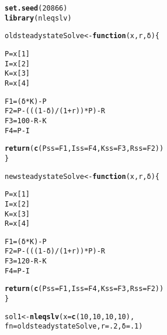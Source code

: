 \documentclass{article}\usepackage[]{graphicx}\usepackage[]{color}
\makeatletter
\newcommand{\hlnum}[1]{\textcolor[rgb]{0.686,0.059,0.569}{#1}}%
\newcommand{\hlopt}[1]{\textcolor[rgb]{0,0,0}{#1}}%
\newcommand{\hlstd}[1]{\textcolor[rgb]{0.345,0.345,0.345}{#1}}%
\newcommand{\hlkwa}[1]{\textcolor[rgb]{0.161,0.373,0.58}{\textbf{#1}}}%
\newcommand{\hlkwb}[1]{\textcolor[rgb]{0.69,0.353,0.396}{#1}}%
\newcommand{\hlkwc}[1]{\textcolor[rgb]{0.333,0.667,0.333}{#1}}%
\newcommand{\hlkwd}[1]{\textcolor[rgb]{0.737,0.353,0.396}{\textbf{#1}}}%
\newenvironment{kframe}{%
 \def\at@end@of@kframe{}%
 \ifinner\ifhmode%
  \def\at@end@of@kframe{\end{minipage}}%
  \begin{minipage}{\columnwidth}%
 \fi\fi%
 \def\FrameCommand##1{\hskip\@totalleftmargin \hskip-\fboxsep
 \colorbox{shadecolor}{##1}\hskip-\fboxsep
     \hskip-\linewidth \hskip-\@totalleftmargin \hskip\columnwidth}%
 \MakeFramed {\advance\hsize-\width
   \@totalleftmargin\z@ \linewidth\hsize
   \@setminipage}}%
 {\par\unskip\endMakeFramed%
 \at@end@of@kframe}
\newenvironment{knitrout}{}{} %
\makeatother
\begin{document}
\begin{knitrout}
\color{fgcolor}\begin{kframe}
\begin{alltt}
\hlkwd{set.seed}\hlstd{(}\hlnum{20866}\hlstd{)}
\hlkwd{library}\hlstd{(nleqslv)}

\hlstd{oldsteadystateSolve} \hlkwb{<-} \hlkwa{function}\hlstd{(}\hlkwc{x}\hlstd{,}\hlkwc{r}\hlstd{,}\hlkwc{δ}\hlstd{)\{}

  \hlstd{P} \hlkwb{=} \hlstd{x[}\hlnum{1}\hlstd{]}
  \hlstd{I} \hlkwb{=} \hlstd{x[}\hlnum{2}\hlstd{]}
  \hlstd{K} \hlkwb{=} \hlstd{x[}\hlnum{3}\hlstd{]}
  \hlstd{R} \hlkwb{=} \hlstd{x[}\hlnum{4}\hlstd{]}

  \hlstd{F1} \hlkwb{=} \hlstd{(δ} \hlopt{*} \hlstd{K)} \hlopt{-} \hlstd{P}
  \hlstd{F2} \hlkwb{=} \hlstd{P} \hlopt{-} \hlstd{(((}\hlnum{1} \hlopt{-}\hlstd{δ)}\hlopt{/}\hlstd{(}\hlnum{1} \hlopt{+} \hlstd{r))} \hlopt{*} \hlstd{P)} \hlopt{-} \hlstd{R}
  \hlstd{F3} \hlkwb{=} \hlnum{100} \hlopt{-} \hlstd{R} \hlopt{-} \hlstd{K}
  \hlstd{F4} \hlkwb{=} \hlstd{P} \hlopt{-} \hlstd{I}

  \hlkwd{return}\hlstd{(}\hlkwd{c}\hlstd{(}\hlkwc{Pss}\hlstd{=F1,} \hlkwc{Iss}\hlstd{=F4,} \hlkwc{Kss}\hlstd{=F3,} \hlkwc{Rss}\hlstd{=F2))}
\hlstd{\}}

\hlstd{newsteadystateSolve} \hlkwb{<-} \hlkwa{function}\hlstd{(}\hlkwc{x}\hlstd{,}\hlkwc{r}\hlstd{,}\hlkwc{δ}\hlstd{)\{}

  \hlstd{P} \hlkwb{=} \hlstd{x[}\hlnum{1}\hlstd{]}
  \hlstd{I} \hlkwb{=} \hlstd{x[}\hlnum{2}\hlstd{]}
  \hlstd{K} \hlkwb{=} \hlstd{x[}\hlnum{3}\hlstd{]}
  \hlstd{R} \hlkwb{=} \hlstd{x[}\hlnum{4}\hlstd{]}

  \hlstd{F1} \hlkwb{=} \hlstd{(δ} \hlopt{*} \hlstd{K)} \hlopt{-} \hlstd{P}
  \hlstd{F2} \hlkwb{=} \hlstd{P} \hlopt{-} \hlstd{(((}\hlnum{1} \hlopt{-}\hlstd{δ)}\hlopt{/}\hlstd{(}\hlnum{1} \hlopt{+} \hlstd{r))} \hlopt{*} \hlstd{P)} \hlopt{-} \hlstd{R}
  \hlstd{F3} \hlkwb{=} \hlnum{120} \hlopt{-} \hlstd{R} \hlopt{-} \hlstd{K}
  \hlstd{F4} \hlkwb{=} \hlstd{P} \hlopt{-} \hlstd{I}

  \hlkwd{return}\hlstd{(}\hlkwd{c}\hlstd{(}\hlkwc{Pss}\hlstd{=F1,} \hlkwc{Iss}\hlstd{=F4,} \hlkwc{Kss}\hlstd{=F3,} \hlkwc{Rss}\hlstd{=F2))}
\hlstd{\}}

\hlstd{sol1} \hlkwb{<-} \hlkwd{nleqslv}\hlstd{(}\hlkwc{x}\hlstd{=}\hlkwd{c}\hlstd{(}\hlnum{10}\hlstd{,}\hlnum{10}\hlstd{,}\hlnum{10}\hlstd{,}\hlnum{10}\hlstd{),}
\hlkwc{fn} \hlstd{= oldsteadystateSolve,} \hlkwc{r} \hlstd{=} \hlnum{.2}\hlstd{,}\hlkwc{δ} \hlstd{=} \hlnum{.1}\hlstd{)}


\end{alltt}
\end{kframe}
\end{knitrout}
\end{document}
